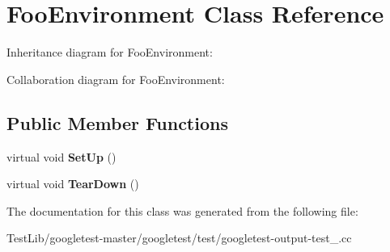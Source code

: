 \hypertarget{classFooEnvironment}{}\section{Foo\+Environment Class Reference}
\label{classFooEnvironment}


Inheritance diagram for Foo\+Environment\+:


Collaboration diagram for Foo\+Environment\+:
\subsection*{Public Member Functions}
\begin{DoxyCompactItemize}
\item 
\mbox{\label{classFooEnvironment_a7db8d8b312805aff437ae8534132a56d}} 
virtual void {\bfseries Set\+Up} ()
\item 
\mbox{\label{classFooEnvironment_a99a2c9df52106cce9e7a4bdda53df802}} 
virtual void {\bfseries Tear\+Down} ()
\end{DoxyCompactItemize}


The documentation for this class was generated from the following file\+:\begin{DoxyCompactItemize}
\item 
Test\+Lib/googletest-\/master/googletest/test/googletest-\/output-\/test\+\_\+.\+cc\end{DoxyCompactItemize}

